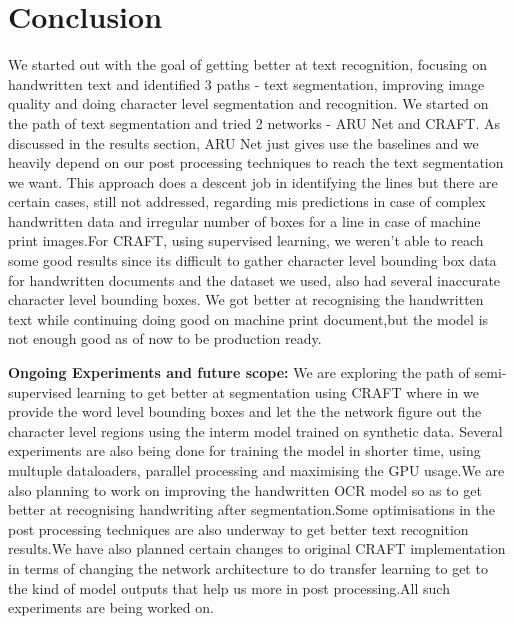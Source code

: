 %

{\let\clearpage\relax \chapter{Conclusion}}

We started out with the goal of getting better at text recognition, focusing on handwritten text and identified 3 paths - text segmentation, improving image quality and doing character level segmentation and recognition. We started on the path of text segmentation and tried 2 networks - ARU Net and CRAFT. As discussed in the results section, ARU Net just gives use the baselines and we heavily depend on our post processing techniques to reach the text segmentation we want. This approach does a descent job in identifying the lines but there are certain cases, still not addressed,  regarding mis predictions in case of complex handwritten data and irregular number of boxes for a line in case of machine print images.For CRAFT, using supervised learning, we weren't able to reach some good results since its difficult to gather character level bounding box data for handwritten documents and the dataset we used, also had several inaccurate character level bounding boxes. We got better at recognising the handwritten text while continuing doing good on machine print document,but the model is not enough good as of now to be production ready.

\textbf{Ongoing Experiments and future scope:} We are exploring the path of semi-supervised learning to get better at segmentation using CRAFT where in we provide the word level bounding boxes and let the the network figure out the character level regions using the interm model trained on synthetic data. Several experiments are also being done for training the model in shorter time, using multuple dataloaders, parallel processing and maximising the GPU usage.We are also planning to work on improving the handwritten OCR model so as to get better at recognising handwriting after segmentation.Some optimisations in the post processing techniques are also underway to get better text recognition results.We have also planned certain changes to original CRAFT implementation in terms of changing the network architecture to do transfer learning to get to the kind of model outputs that help us more in post processing.All such experiments are being worked on. 

